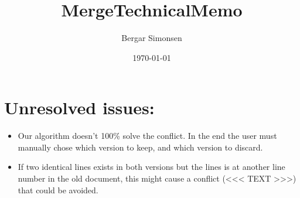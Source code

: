 \documentclass[11pt]{article}
\title{MergeTechnicalMemo}
\author{Bergar Simonsen}
\date{\today}
\begin{document}
\maketitle

\setcounter{tocdepth}{3}
\tableofcontents
\vspace*{1cm}
\section{Unresolved issues:}
\label{sec-1}

\begin{itemize}
\item Our algorithm doesn't 100\% solve the conflict. In the end the user must manually chose which
     version to keep, and which version to discard.
\item If two identical lines exists in both versions but the lines is at another line number in the old
     document, this might cause a conflict (<<< TEXT >>>) that could be avoided.
\end{itemize}
\end{document}
